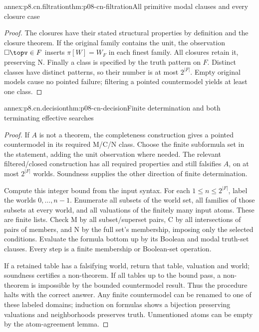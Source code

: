 \begin{annexitem}{annex:p8.cn.filtration}{thm:p08-cn-filtration}{All primitive modal clauses and every closure case}
\begin{proof}
The closures have their stated structural properties by definition
and the closure theorem. If the original family contains the unit,
the observation \(\Box\topv\in F\) inserts \(\pi[W]=W_F\)
in each finest family. All closures retain it, preserving N.
Finally a class is specified by the truth pattern on \(F\).
Distinct classes have distinct patterns, so their number is at
most \(2^{|F|}\). Empty original models cause no pointed
failure; filtering a pointed countermodel yields at least one class.
\end{proof}
\end{annexitem}

\begin{annexitem}{annex:p8.cn.decision}{thm:p08-cn-decision}{Finite determination and both terminating effective searches}
\begin{proof}
If \(A\) is not a theorem, the completeness construction gives
a pointed countermodel in its required M/C/N class. Choose the
finite subformula set in the statement, adding the unit observation
where needed. The relevant filtered/closed construction has all
required properties and still falsifies \(A\), on at most
\(2^{|F|}\) worlds. Soundness supplies the other direction of
finite determination.

Compute this integer bound from the input syntax. For each
\(1\leq n\leq2^{|F|}\), label the worlds
\(0,\ldots,n-1\). Enumerate all subsets of the world set,
all families of those subsets at every world, and all valuations
of the finitely many input atoms. These are finite lists. Check
M by all subset/superset pairs, C by all intersections of pairs
of members, and N by the full set's membership, imposing only
the selected conditions. Evaluate the formula bottom up by its
Boolean and modal truth-set clauses. Every step is a finite
membership or Boolean-set operation.

If a retained table has a falsifying world, return that table,
valuation and world; soundness certifies a non-theorem. If all
tables up to the bound pass, a non-theorem is impossible by
the bounded countermodel result. Thus the procedure halts with
the correct answer. Any finite countermodel can be renamed to
one of these labeled domains; induction on formulas shows a
bijection preserving valuations and neighborhoods preserves truth.
Unmentioned atoms can be empty by the atom-agreement lemma.


\end{proof}
\end{annexitem}
